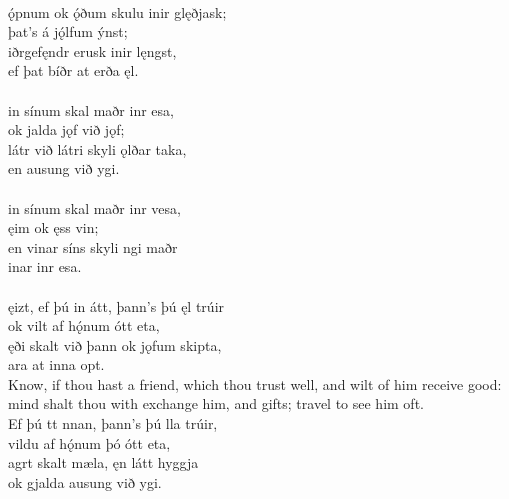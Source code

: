  \\

\bva {}ǫ́pnum ok ǫ́ðum \hld skulu inir glęðjask; \\%
\ind þat's á jǫ́lfum ýnst; \\%
iðrgefęndr \hld erusk inir lęngst, \\%
\ind ef þat bíðr at erða ęl.\\%

 \\

\bva {}in sínum \hld skal maðr inr esa, \\%
\ind ok jalda jǫf við jǫf; \\%
látr við látri \hld skyli ǫlðar taka, \\%
\ind en ausung við ygi.\\%

 \\

\bva {}in sínum \hld skal maðr inr vesa, \\%
\ind {}ęim ok ęss vin; \\%
en vinar síns \hld skyli ngi maðr \\%
\ind {}inar inr esa.\\%

 \\

\bva {}ęizt, ef þú in átt, \hld þann's þú ęl trúir \\%
\ind ok vilt af hǫ́num ótt eta, \\%
ęði skalt við þann \hld ok jǫfum skipta, \\%
\ind {}ara at inna opt.\\%

\bvb Know, if thou hast a friend, which thou trust well, and wilt of him receive good: mind shalt thou with exchange him, and gifts; travel to see him oft. \\

\bva Ef þú tt nnan, \hld þann's þú lla trúir, \\%
\ind vildu af hǫ́num þó ótt eta, \\%
agrt skalt mæla, \hld ęn látt hyggja \\%
\ind ok gjalda ausung við ygi.\\%

